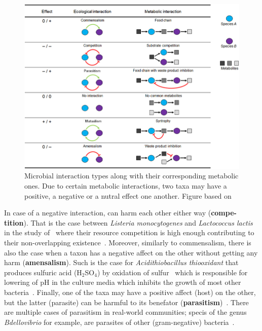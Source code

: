    \begin{figure}
      \centering
      \includegraphics[width=.9\textwidth]{figures/interaction_types.jpg}
      \caption[Microbial interactions types]{Microbial interaction types along 
      with their corresponding metabolic ones.
      Due to certain metabolic interactions, two taxa may have a positive, a negative
      or a nutral effect one another. 
      Figure based on \cite{perez2016metabolic}}
      \label{fig:micro-inter-types}
   \end{figure}

   In case of a negative interaction, can harm each other either way (\textbf{compe-tition}). 
   That is the case between 
   \textit{Listeria monocytogenes} and \textit{Lactococcus lactis} in the study of~\citeauthor{freilich2010large} where their resource competition is high enough
   contributing to their non-overlapping existence~\cite{freilich2010large}.
   Moreover, similarly to commensalism, 
   there is also the case when a taxon has a negative affect on the other
   without getting any harm (\textbf{amensalism}). 
   Such is the case for \textit{Acidithiobacillus thiooxidant} that produces
   sulfuric acid (H$_2$SO$_4$) by oxidation of sulfur~\cite{bobadilla2013stoichiometric} which is responsible for lowering of pH in the culture media which inhibits the growth of most other bacteria~\cite{jin2018ph}.
   Finally, one of the taxa may have a positive affect (host) on the other, but the 
   latter (parasite) can be harmful to its benefator (\textbf{parasitism})~\cite{faust2012microbial}. 
   There are multiple cases of parasitism in real-world communities; 
   specis of the genus \textit{Bdellovibrio} for example, are parasites of other (gram-negative) bacteria~\cite{stolp1979interactions}.

